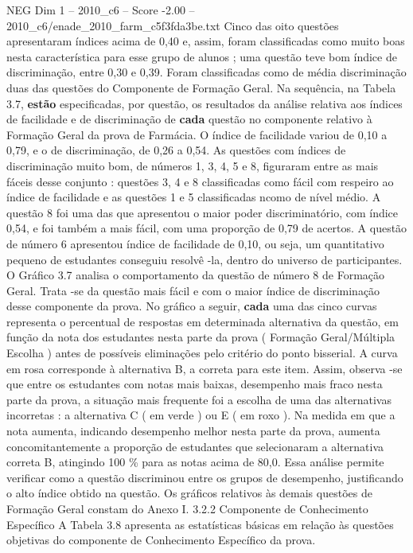 \begin{textsample}{NEG Dim 1 – 2010\_c6 – Score -2.00 – 2010\_c6/enade\_2010\_farm\_c5f3fda3be.txt}
Cinco das oito questões apresentaram índices acima de 0,40 e, assim, foram classificadas como muito boas nesta característica para esse grupo de alunos ; uma questão teve bom índice de discriminação, entre 0,30 e 0,39.
Foram classificadas como de média discriminação duas das questões do Componente de Formação Geral.
Na sequência, na Tabela 3.7, \textbf{estão} especificadas, por questão, os resultados da análise relativa aos índices de facilidade e de discriminação de \textbf{cada} questão no componente relativo à Formação Geral da prova de Farmácia.
O índice de facilidade variou de 0,10 a 0,79, e o de discriminação, de 0,26 a 0,54.
As questões com índices de discriminação muito bom, de números 1, 3, 4, 5 e 8, figuraram entre as mais fáceis desse conjunto : questões 3, 4 e 8 classificadas como fácil com respeiro ao índice de facilidade e as questões 1 e 5 classificadas ncomo de nível médio.
A questão 8 foi uma das que apresentou o maior poder discriminatório, com índice 0,54, e foi também a mais fácil, com uma proporção de 0,79 de acertos.
A questão de número 6 apresentou índice de facilidade de 0,10, ou seja, um quantitativo pequeno de estudantes conseguiu resolvê -la, dentro do universo de participantes.
O Gráfico 3.7 analisa o comportamento da questão de número 8 de Formação Geral.
Trata -se da questão mais fácil e com o maior índice de discriminação desse componente da prova.
No gráfico a seguir, \textbf{cada} uma das cinco curvas representa o percentual de respostas em determinada alternativa da questão, em função da nota dos estudantes nesta parte da prova ( Formação Geral/Múltipla Escolha ) antes de possíveis eliminações pelo critério do ponto bisserial.
A curva em rosa corresponde à alternativa B, a correta para este item.
Assim, observa -se que entre os estudantes com notas mais baixas, desempenho mais fraco nesta parte da prova, a situação mais frequente foi a escolha de uma das alternativas incorretas : a alternativa C ( em verde ) ou E ( em roxo ).
Na medida em que a nota aumenta, indicando desempenho melhor nesta parte da prova, aumenta concomitantemente a proporção de estudantes que selecionaram a alternativa correta B, atingindo 100 \% para as notas acima de 80,0.
Essa análise permite verificar como a questão discriminou entre os grupos de desempenho, justificando o alto índice obtido na questão.
Os gráficos relativos às demais questões de Formação Geral constam do Anexo I. 3.2.2 Componente de Conhecimento Específico A Tabela 3.8 apresenta as estatísticas básicas em relação às questões objetivas do componente de Conhecimento Específico da prova.

\end{textsample}
